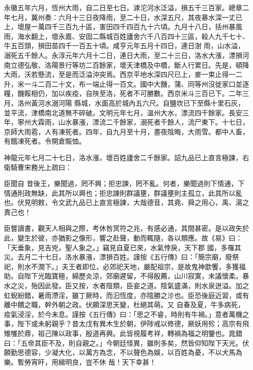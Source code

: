 \begin{pinyinscope}
 永徽五年六月，恆州大雨，自二日至七日。滹沱河水泛溢，損五千三百家。總章二年七月，冀州奏：六月十三日夜降雨，至二十日，水深五尺，其夜暴水深一丈已上，壞屋一萬四千三百九十區，害田四千四百九十六頃。九月十八日，括州暴風雨，海水翻上，壞永嘉、安固二縣城百姓廬舍六千八百四十三區，殺人九千七十、牛五百頭，損田苗四千一百五十頃。咸亨元年五月十四日，連日澍
 雨，山水溢，溺死五千餘人。永淳元年六月十二日，連日大雨，至二十三日，洛水大漲，漂損河南立德弘敬、洛陽景行等坊二百餘家，壞天津橋及中橋，斷人行累日。先是，頓降大雨，沃若懸流，至是而泛溢沖突焉。西京平地水深四尺已上，麥一束止得一二升，米一斗二百二十文，布一端止得一百文。國中大饑，蒲、同等州沒徙家口並逐糧，饑餒相仍，加以疾疫，自陜至洛，死者不可勝數。西京米斗三百已下。二年三月，洛州黃河水溺河陽
 縣城，水面高於城內五六尺。自鹽坎已下至縣十里石灰，並平流，津橋南北道無不碎破。文明元年七月，溫州大水，漂流四千餘家。長安三年，寧州大霖雨，山水暴漲，漂流二千餘家，溺死者千餘人，流尸東下。十七日，京師大雨雹，人有凍死者。四年，自九月至十月，晝夜陰晦，大雨雪。都中人畜，有餓凍死者。令開倉賑恤。



 神龍元年七月二十七日，洛水漲，壞百姓廬舍二千餘家。詔九品已上直言極諫，右衛騎曹宋務光上疏曰：



 臣聞自
 昔後王，樂聞過，罔不興；拒忠諫，罔不亂。何者，樂聞過則下情通，下情通則政無缺，此其所以興也；拒忠諫則群議壅，群議壅則主孤立，此其所以亂也。伏見明敕，令文武九品已上直言極諫，大哉德音，其堯、舜之用心，禹、湯之責己也！



 臣嘗讀書，觀天人相與之際，考休咎冥符之兆，有感必通，其間甚密。是以政失於此，變生於彼，亦猶影之像形，響之赴聲，動而輒隨，各以類應。故《易》曰：「天垂象，見吉兇，聖人象之。」竊見自夏已來，水氣悖戾，天下郡
 國，多罹其災。去月二十七日，洛水暴漲，漂損百姓。謹按《五行傳》曰：「簡宗廟，廢祭祀，則水不潤下。」夫王者即位，必郊祀天地，嚴配祖宗，是故鬼神歆饗，多獲福助。自陛下光臨寶極，綿歷炎涼，郊廟遲留，不得殷薦，山川寂寞，未議懷柔。暴水之災，殆因此發。臣又按，水者陰類，臣妾之道。陰氣盛滿，則水泉迸溢。加之虹蜺紛錯，暑雨滯淫，雖丁厥時，而汩恆度，亦陰勝之沴也。臣恐後庭近習，或有離中饋之職，幹外朝之政。伏願深思天變，杜絕其萌。又
 自春及夏，牛多病死，疫氣浸淫，於今未息。謹按《五行傳》曰：「思之不睿，時則有牛禍。」意者萬機之事，陛下或未躬親乎？昔太戊有異木生於朝，伊陟戒以修德，厥妖用殄；高宗有飛雉雊於鼎，祖己陳以政事，殷道再興。此皆視履考祥，轉禍為福之明鑒也。晁錯曰：「五帝其臣不及，則自親之。」今朝廷怪異，雖則多矣，然皆仰知陛下天光。伏願勤思德容，少凝大化，以萬方為念，不以聲色為娛，以百姓為憂，不以犬馬為樂。暫勞宵旰，用緝明良，豈不休
 哉！天下幸甚！




\end{pinyinscope}
